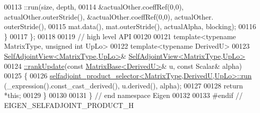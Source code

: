 \begin{DoxyCode}
00113       ::run(size, depth,
00114             &actualOther.coeffRef(0,0), actualOther.outerStride(), &actualOther.coeffRef(0,0), actualOther.
      outerStride(),
00115             mat.data(), mat.outerStride(), actualAlpha, blocking);
00116   \}
00117 \};
00118 
00119 \textcolor{comment}{// high level API}
00120 
00121 \textcolor{keyword}{template}<\textcolor{keyword}{typename} MatrixType, \textcolor{keywordtype}{unsigned} \textcolor{keywordtype}{int} UpLo>
00122 \textcolor{keyword}{template}<\textcolor{keyword}{typename} DerivedU>
00123 \hyperlink{group___core___module_class_eigen_1_1_self_adjoint_view}{SelfAdjointView<MatrixType,UpLo>}& 
      \hyperlink{group___core___module_a4739585861baa13b25dcce5ed6658311}{SelfAdjointView<MatrixType,UpLo>}
00124 \hyperlink{group___core___module_a4739585861baa13b25dcce5ed6658311}{::rankUpdate}(\textcolor{keyword}{const} \hyperlink{group___core___module_class_eigen_1_1_matrix_base}{MatrixBase<DerivedU>}& u, \textcolor{keyword}{const} Scalar& alpha)
00125 \{
00126   \hyperlink{struct_eigen_1_1selfadjoint__product__selector}{selfadjoint\_product\_selector<MatrixType,DerivedU,UpLo>::run}
      (\_expression().const\_cast\_derived(), u.derived(), alpha);
00127 
00128   \textcolor{keywordflow}{return} *\textcolor{keyword}{this};
00129 \}
00130 
00131 \} \textcolor{comment}{// end namespace Eigen}
00132 
00133 \textcolor{preprocessor}{#endif // EIGEN\_SELFADJOINT\_PRODUCT\_H}
\end{DoxyCode}
